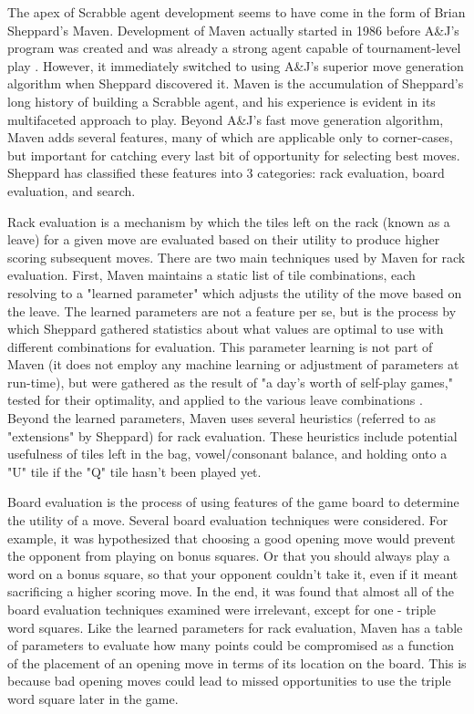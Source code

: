 \documentclass[letterpaper]{article}
\begin{document}
The apex of Scrabble agent development seems to have come in the form of Brian Sheppard's Maven. Development of Maven actually started in 1986 before A\&J's program was created and was already a strong agent capable of tournament-level play \cite{Schaeffer2001}. However, it immediately switched to using A\&J's superior move generation algorithm when Sheppard discovered it. Maven is the accumulation of Sheppard's long history of building a Scrabble agent, and his experience is evident in its multifaceted approach to play. Beyond A\&J's fast move generation algorithm, Maven adds several features, many of which are applicable only to corner-cases, but important for catching every last bit of opportunity for selecting best moves. Sheppard has classified these features into 3 categories: rack evaluation, board evaluation, and search. 

Rack evaluation is a mechanism by which the tiles left on the rack (known as a leave) for a given move are evaluated based on their utility to produce higher scoring subsequent moves. There are two main techniques used by Maven for rack evaluation. First, Maven maintains a static list of tile combinations, each resolving to a "learned parameter" which adjusts the utility of the move based on the leave. The learned parameters are not a feature per se, but is the process by which Sheppard gathered statistics about what values are optimal to use with different combinations for evaluation. This parameter learning is not part of Maven (it does not employ any machine learning or adjustment of parameters at run-time), but were gathered as the result of "a day's worth of self-play games," tested for their optimality, and applied to the various leave combinations \cite{1sheppard2002}. Beyond the learned parameters, Maven uses several heuristics (referred to as "extensions" by Sheppard) for rack evaluation. These heuristics include potential usefulness of tiles left in the bag, vowel/consonant balance, and holding onto a "U" tile if the "Q" tile hasn't been played yet.

Board evaluation is the process of using features of the game board to determine the utility of a move. Several board evaluation techniques were considered. For example, it was hypothesized that choosing a good opening move would prevent the opponent from playing on bonus squares. Or that you should always play a word on a bonus square, so that your opponent couldn't take it, even if it meant sacrificing a higher scoring move. In the end, it was found that almost all of the board evaluation techniques examined were irrelevant, except for one - triple word squares. Like the learned parameters for rack evaluation, Maven has a table of parameters to evaluate how many points could be compromised as a function of the placement of an opening move in terms of its location on the board. This is because bad opening moves could lead to missed opportunities to use the triple word square later in the game.
\end{document}
